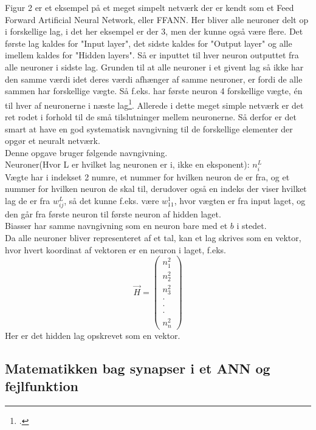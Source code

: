 Figur 2 er et eksempel på et meget simpelt netværk der er kendt som et Feed Forward Artificial Neural Network, eller FFANN.
Her bliver alle neuroner delt op i forskellige lag, i det her eksempel er der 3, men der kunne også være flere. Det første lag
kaldes for "Input layer", det sidste kaldes for "Output layer" og alle imellem kaldes for "Hidden layers". Så er inputtet
til hver neuron outputtet fra alle neuroner i sidste lag. Grunden til at alle neuroner i et givent lag så ikke har den samme værdi
idet deres værdi afhænger af samme neuroner, er fordi de alle sammen har forskellige vægte. Så f.eks. har første neuron 4 forskellige vægte,
én til hver af neuronerne i næste lag\footcite{ANN11}. Allerede i dette meget simple netværk er det ret rodet i forhold til de små tilslutninger mellem neuronerne.
Så derfor er det smart at have en god systematisk navngivning til de forskellige elementer der opgør et neuralt netværk.\\
Denne opgave bruger følgende navngivning.\\
Neuroner(Hvor L er hvilket lag neuronen er i, ikke en eksponent): $n^L_{i}$ \\
Vægte har i indekset 2 numre, et nummer for hvilken neuron de er fra, og et nummer for hvilken neuron de skal til, derudover også  en indeks der viser hvilket lag de er fra
$w_{ij}^{L}$, så det kunne f.eks. være $w_{11}^1$, hvor vægten er fra input laget, og den går fra første neuron til første neuron af hidden laget.\\
Biasser har samme navngivning som en neuron bare med et $b$ i stedet.\\
Da alle neuroner bliver representeret af et tal, kan et lag skrives som en vektor, hvor hvert koordinat af vektoren er en neuron i laget, f.eks.
$$\vec{H} = \begin{pmatrix} n^2_1 \\ n^2_2 \\ n^2_3 \\ \cdot \\ \cdot \\ \cdot \\ n^2_n \end{pmatrix}$$
Her er det hidden lag opskrevet som en vektor.

\subsection{Matematikken bag synapser i et ANN og fejlfunktion}


